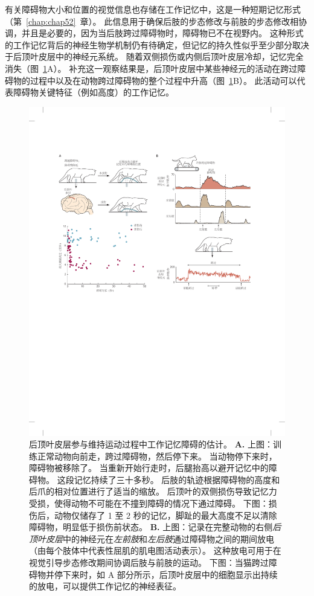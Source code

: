 有关障碍物大小和位置的视觉信息也存储在工作记忆中，这是一种短期记忆形式（第~\ref{chap:chap52}~章）。
此信息用于确保后肢的步态修改与前肢的步态修改相协调，并且是必要的，因为当后肢跨过障碍物时，障碍物已不在视野内。
这种形式的工作记忆背后的神经生物学机制仍有待确定，但记忆的持久性似乎至少部分取决于后顶叶皮层中的神经元系统。
随着双侧损伤或内侧后顶叶皮层冷却，记忆完全消失（图~\ref{fig:33_16}A）。
补充这一观察结果是，后顶叶皮层中某些神经元的活动在跨过障碍物的过程中以及在动物跨过障碍物的整个过程中升高（图~\ref{fig:33_16}B）。
此活动可以代表障碍物关键特征（例如高度）的工作记忆。


\begin{figure}[htbp]
	\centering
	\includegraphics[width=1.0\linewidth]{chap33/fig_33_16}
	\caption{后顶叶皮层参与维持运动过程中工作记忆障碍的估计。
		\textbf{A.} 上图：训练正常动物向前走，跨过障碍物，然后停下来。
		当动物停下来时，障碍物被移除了。
		当重新开始行走时，后腿抬高以避开记忆中的障碍物。
		这段记忆持续了三十多秒。
		后肢的轨迹根据障碍物的高度和后爪的相对位置进行了适当的缩放。
		后顶叶的双侧损伤导致记忆力受损，使得动物不可能在不撞到障碍的情况下通过障碍。
		下图：损伤后，动物仅储存了 1 至 2 秒的记忆，脚趾的最大高度不足以清除障碍物，明显低于损伤前状态\cite{mcvea2009object}。
		\textbf{B.} 上图：记录在完整动物的右侧\textit{后顶叶皮层}中的神经元在\textit{左前肢}和\textit{左后肢}通过障碍物之间的期间放电（由每个肢体中代表性屈肌的肌电图活动表示）。
		这种放电可用于在视觉引导步态修改期间协调后肢与前肢的运动。
		下图：当猫跨过障碍物并停下来时，如 A 部分所示，后顶叶皮层中的细胞显示出持续的放电，可以提供工作记忆的神经表征\cite{lajoie2010neurons}。}
	\label{fig:33_16}
\end{figure}



